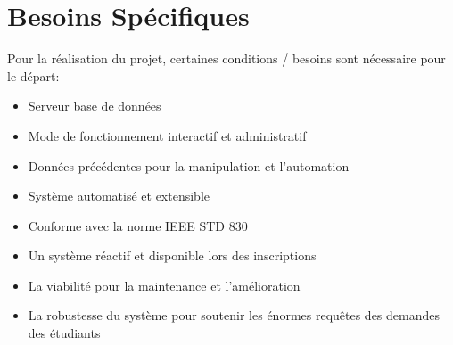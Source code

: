 \section{Besoins Spécifiques}
Pour la réalisation du projet, certaines conditions / besoins sont nécessaire
pour le départ:
\begin{itemize}
    \item Serveur base de données
    \item Mode de fonctionnement interactif et administratif
    \item Données précédentes pour la manipulation et l'automation
    \item Système automatisé et extensible
    \item Conforme avec la norme IEEE STD 830
    \item Un système réactif et disponible lors des inscriptions
    \item La viabilité pour la maintenance et l'amélioration
    \item La robustesse du système pour soutenir les énormes requêtes des demandes des
          étudiants

\end{itemize}